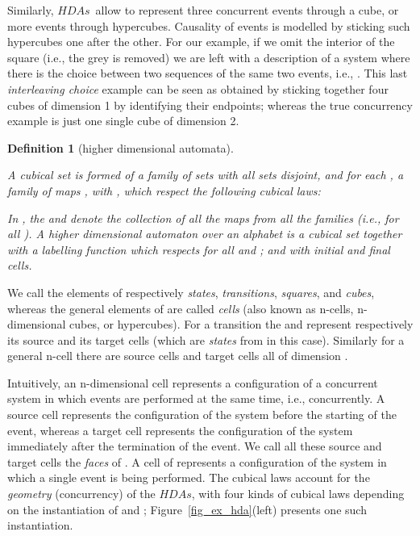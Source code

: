 \documentclass[submission,copyright,creativecommons]{eptcs}
\newtheorem{definition}[theorem]{Definition}
\newcounter{case}
\newcommand\HDAs{\ensuremath{\mathit{HDAs}}}
\begin{document}
Similarly, \HDAs\ allow to represent three concurrent events through a cube, or more events through hypercubes. Causality of events is modelled by sticking such hypercubes one after the other. For our example, if we omit the interior of the square (i.e., the grey  is removed) we are left with a description of a system where there is the choice between two sequences of the same two events, i.e., .
This last \textit{interleaving choice} example can be seen as obtained by sticking together four cubes of dimension 1 by identifying their endpoints; whereas the true concurrency example is just one single cube of dimension 2.

\begin{definition}[higher dimensional automata]\label{def_hda}\ 

A \emph{cubical set}  is formed of a family of sets  with all sets  disjoint, and for each , a family of maps , with , which respect the following \emph{cubical laws}:

In , the  and  denote the collection of all the maps from all the families (i.e., for all ).
A \emph{higher dimensional automaton}  over an alphabet  is a cubical set together with a \emph{labelling function}  which respects  for all  and ; and with  \emph{initial} and  \emph{final} cells.
\end{definition}


We call the elements of  respectively \textit{states}, \textit{transitions}, \textit{squares}, and \textit{cubes}, whereas the general elements of  are called \textit{cells} (also known as n-cells, n-dimensional cubes, or hypercubes).
For a transition  the  and  represent respectively its source and its target cells (which are \textit{states} from  in this case). Similarly for a general n-cell  there are  source cells and  target cells all of dimension . 

Intuitively, an n-dimensional cell  represents a configuration of a concurrent system in which  events are performed at the same time, i.e., concurrently. A source cell  represents the configuration of the system before the starting of the  event, whereas a target cell  represents the configuration of the system immediately after the termination of the  event. We call all these source and target cells the \emph{faces} of .
A cell of  represents a configuration of the system in which a single event is being performed.
The cubical laws account for the \textit{geometry} (concurrency) of the \HDAs, with four kinds of cubical laws depending on the instantiation of  and ; Figure~\ref{fig_ex_hda}(left) presents one such instantiation.
\end{document}
